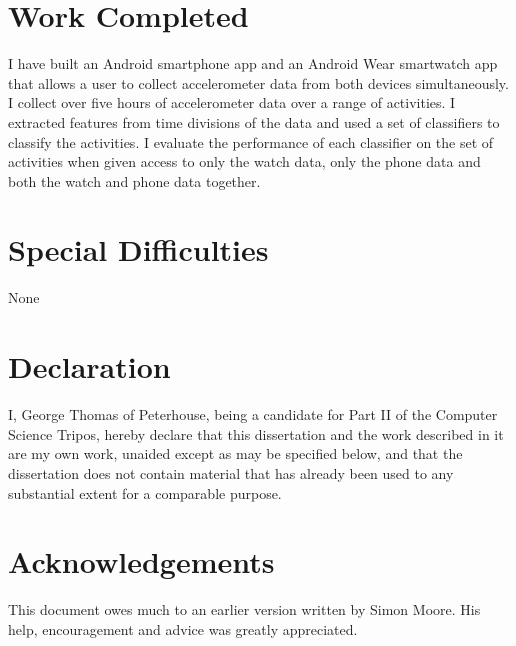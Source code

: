 \documentclass[12pt,a4paper,twoside,openright]{report}
\begin{document}
\section*{Work Completed}

  I have built an Android smartphone app and an Android Wear smartwatch app that allows a user to collect accelerometer data from both devices simultaneously. I collect over five hours of accelerometer data over a range of activities. I extracted features from time divisions of the data and used a set of classifiers to classify the activities. I evaluate the performance of each classifier on the set of activities when given access to only the watch data, only the phone data and both the watch and phone data together.

\section*{Special Difficulties}

None

\newpage
\section*{Declaration}

I, George Thomas of Peterhouse, being a candidate for Part II of the Computer
Science Tripos, hereby declare
that this dissertation and the work described in it are my own work,
unaided except as may be specified below, and that the dissertation
does not contain material that has already been used to any substantial
extent for a comparable purpose.

\bigskip
{}

\medskip
{}

\tableofcontents

\listoffigures

\newpage
\section*{Acknowledgements}

This document owes much to an earlier version written by Simon Moore.  His help, encouragement and advice was greatly
appreciated.


\pagestyle{headings}












\printbibliography
\end{document}
